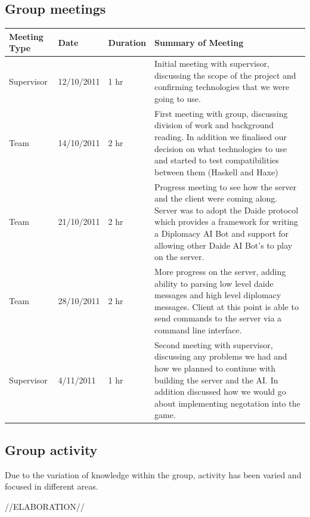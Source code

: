 \documentclass[11pt]{article}
\begin{document}
\subsection{Group meetings}
\begin{center}
    \begin{tabular}{ | l | l | l | p{8cm} |}
    \hline
    Meeting Type       & Date          & Duration   & Summary of Meeting \\ \hline

    Supervisor         & 12/10/2011    & 1 hr       & Initial meeting with supervisor, discussing the scope of the project and confirming technologies that we were going to use. \\ \hline
    Team               & 14/10/2011    & 2 hr       & First meeting with group, discussing division of work and background reading. In addition we finalised our decision on what technologies to use and started to test compatibilities between them (Haskell and Haxe) \\ \hline
    Team               & 21/10/2011    & 2 hr       & Progress meeting to see how the server and the client were coming along. Server was to adopt the Daide protocol which provides a framework for writing a Diplomacy AI Bot and support for allowing other Daide AI Bot's to play on the server.  \\ \hline
    Team               & 28/10/2011    & 2 hr       & More progress on the server, adding ability to parsing low level daide messages and high level diplomacy messages. Client at this point is able to send commands to the server via a command line interface.  \\ \hline
    Supervisor               & 4/11/2011     & 1 hr       & Second meeting with supervisor, discussing any problems we had and how we planned to continue with building the server and the AI. In addition discussed how we would go about implementing negotation into the game.  \\ \hline

    \end{tabular}
\end{center}

\subsection{Group activity}
Due to the variation of knowledge within the group, activity has been varied
and focused in different areas. 

//ELABORATION//
\end{document}
